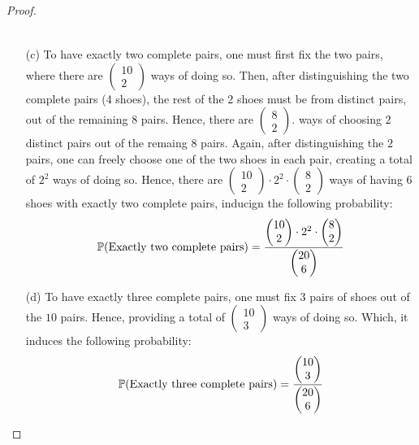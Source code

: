 \documentclass{article}
\begin{document}
\begin{proof}
\begin{itemize}
\begin{align}
        \end{align}
        \item[(c)] To have exactly two complete pairs, one must first fix the two pairs, where there are $\begin{pmatrix}10\\2\end{pmatrix}$ ways of doing so. Then, after distinguishing the two complete pairs (4 shoes), the rest of the $2$ shoes must be from distinct pairs, out of the remaining $8$ pairs. Hence, there are $\begin{pmatrix}8\\2\end{pmatrix}$. ways of choosing $2$ distinct pairs out of the remaing $8$ pairs. Again, after distinguishing the $2$ pairs, one can freely choose one of the two shoes in each pair, creating a total of $2^2$ ways of doing so. Hence, there are $\begin{pmatrix}10\\2\end{pmatrix}\cdot 2^2\cdot \begin{pmatrix}8\\2\end{pmatrix}$ ways of having $6$ shoes with exactly two complete pairs, inducign the following probability:
        \begin{align}
            \mathbb{P}(\textmd{Exactly two complete pairs})=\frac{\begin{pmatrix}10\\2\end{pmatrix}\cdot 2^2\cdot \begin{pmatrix}8\\2\end{pmatrix}}{\begin{pmatrix}20\\6\end{pmatrix}}
        \end{align}
        \item[(d)] To have exactly three complete pairs, one must fix $3$ pairs of shoes out of the $10$ pairs. Hence, providing a total of $\begin{pmatrix}10\\3\end{pmatrix}$ ways of doing so. Which, it induces the following probability:
        \begin{align}
            \mathbb{P}(\text{Exactly three complete pairs})=\frac{\begin{pmatrix}10\\3\end{pmatrix}}{\begin{pmatrix}20\\6\end{pmatrix}}
        \end{align}
    \end{itemize}
\end{proof}
\end{document}
